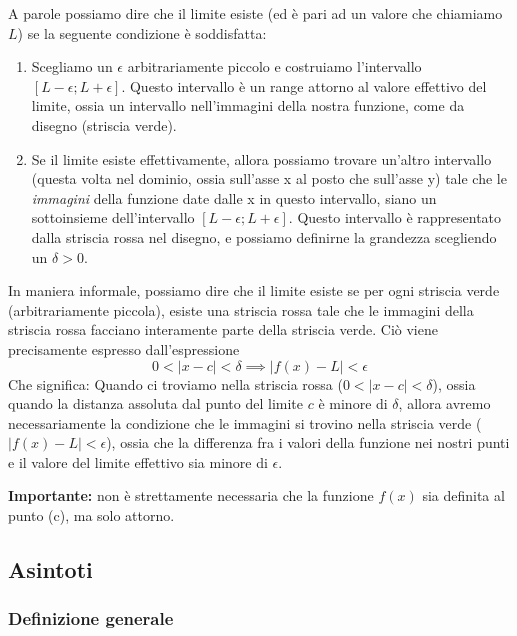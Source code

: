 \documentclass{article}
\begin{document}
A parole possiamo dire che il limite esiste (ed è pari ad un valore che chiamiamo \(L\))
se la seguente condizione è soddisfatta:
\begin{enumerate}
    \item Scegliamo un \(\epsilon\) arbitrariamente piccolo e costruiamo l'intervallo \([L-\epsilon;L+\epsilon]\).
        Questo intervallo è un range attorno al valore effettivo del limite,
        ossia un intervallo nell'immagini della nostra funzione, come da disegno (striscia verde).
    \item Se il limite esiste effettivamente, allora possiamo trovare un'altro intervallo (questa volta
        nel dominio, ossia sull'asse x al posto che sull'asse y) tale che le \textit{immagini}
        della funzione date dalle x in questo intervallo, siano un sottoinsieme dell'intervallo
        \([L-\epsilon;L+\epsilon]\). Questo intervallo è rappresentato dalla striscia rossa nel disegno,
        e possiamo definirne la grandezza scegliendo un \(\delta > 0\).
\end{enumerate}

In maniera informale, possiamo dire che il limite esiste se per ogni striscia verde (arbitrariamente piccola),
esiste una striscia rossa tale che le immagini della striscia rossa facciano interamente parte della striscia verde.
Ciò viene precisamente espresso dall'espressione
\[
    0<|x-c|<\delta
    \implies
    |f(x)-L|<\epsilon
\]
Che significa: Quando ci troviamo nella striscia rossa (\(0<|x-c|<\delta\)),
ossia quando la distanza assoluta dal punto del limite \(c\) è minore di \(\delta\),
allora avremo necessariamente la condizione che le immagini si trovino nella striscia verde
(\(|f(x)-L|<\epsilon\)), ossia che la differenza fra i valori della funzione nei nostri punti e il
valore del limite effettivo sia minore di \(\epsilon\).

\textbf{\color{red}Importante:} non è strettamente necessaria che la funzione
\(f(x)\) sia definita al punto (c), ma solo attorno.

\newpage

\subsection{Asintoti}

\subsubsection{Definizione generale}

\end{document}

